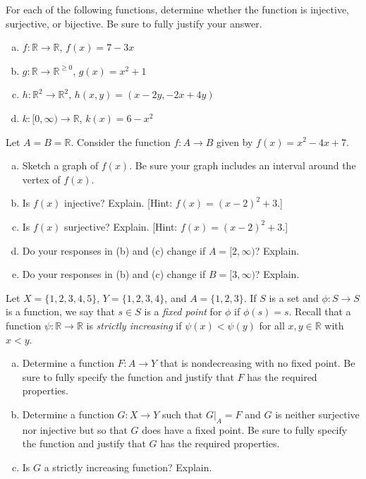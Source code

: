 \documentclass[11pt,letterpaper]{article}
\begin{document}

 For each of the following functions, determine whether the function is injective, surjective, or bijective. Be sure to fully justify your answer.
	\begin{enumerate}[(a)]
	\item $f: \mathbb{R} \to \mathbb{R}$, $f(x)= 7 - 3x$
	\item $g: \mathbb{R} \to \mathbb{R}^{\geq 0}$, $g(x)= x^2 + 1$
	\item $h: \mathbb{R}^2 \to \mathbb{R}^2$, $h(x, y)= (x - 2y, -2x + 4y)$
	\item $k: [0, \infty) \to \mathbb{R}$, $k(x)= 6 - x^2$
	\end{enumerate}



\newpage



 Let $A= B= \mathbb{R}$. Consider the function $f: A \to B$ given by $f(x)= x^2 - 4x + 7$.
	\begin{enumerate}[(a)]
	\item Sketch a graph of $f(x)$. Be sure your graph includes an interval around the vertex of $f(x)$.
	\item Is $f(x)$ injective? Explain. [Hint: $f(x)= (x - 2)^2 + 3$.]
	\item Is $f(x)$ surjective? Explain. [Hint: $f(x)= (x - 2)^2 + 3$.]
	\item Do your responses in (b) and (c) change if $A= [2, \infty)$? Explain. 
	\item Do your responses in (b) and (c) change if $B= [3, \infty)$? Explain. 
	\end{enumerate}



\newpage



 Let $X= \{ 1, 2, 3, 4, 5 \}$, $Y= \{ 1, 2, 3, 4 \}$, and $A= \{ 1, 2, 3 \}$. If $S$ is a set and $\phi: S \to S$ is a function, we say that $s \in S$ is a \textit{fixed point} for $\phi$ if $\phi(s)= s$. Recall that a function $\psi: \mathbb{R} \to \mathbb{R}$ is \textit{strictly increasing} if $\psi(x) < \psi(y)$ for all $x, y \in \mathbb{R}$ with $x < y$.
	\begin{enumerate}[(a)]
	\item Determine a function $F: A \to Y$ that is nondecreasing with no fixed point. Be sure to fully specify the function and justify that $F$ has the required properties. 
	\item Determine a function $G: X \to Y$ such that $G \big|_A= F$ and $G$ is neither surjective nor injective but so that $G$ does have a fixed point. Be sure to fully specify the function and justify that $G$ has the required properties. 
	\item Is $G$ a strictly increasing function? Explain. 
	\end{enumerate}
	
\end{document}
